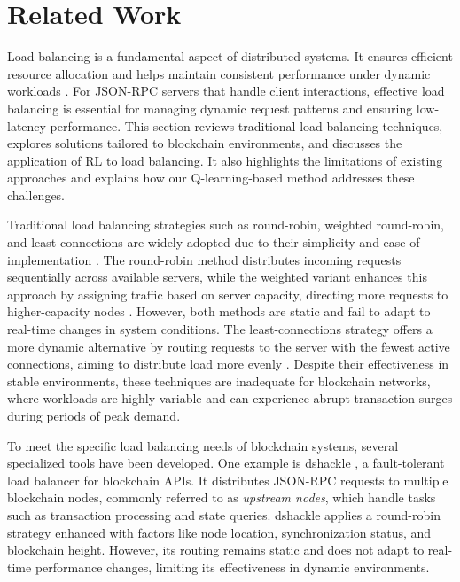 \documentclass[lnbip]{svmultln}
\begin{document}
\section{Related Work}\label{s:2}
Load balancing is a fundamental aspect of distributed systems. It ensures efficient resource allocation and helps maintain consistent performance under dynamic workloads \cite{ivanisenko2015}.  For JSON-RPC servers that handle client interactions, effective load balancing is essential for managing dynamic request patterns and ensuring low-latency performance. This section reviews traditional load balancing techniques, explores solutions tailored to blockchain environments, and discusses the application of RL to load balancing. It also highlights the limitations of existing approaches and explains how our Q-learning-based method addresses these challenges.

Traditional load balancing strategies such as round-robin, weighted round-robin, and least-connections are widely adopted due to their simplicity and ease of implementation \cite{ibrahim2021web, jader2019state}. The round-robin method distributes incoming requests sequentially across available servers, while the weighted variant enhances this approach by assigning traffic based on server capacity, directing more requests to higher-capacity nodes \cite{gilly2011up}. However, both methods are static and fail to adapt to real-time changes in system conditions. The least-connections strategy offers a more dynamic alternative by routing requests to the server with the fewest active connections, aiming to distribute load more evenly \cite{gilly2011up}. Despite their effectiveness in stable environments, these techniques are inadequate for blockchain networks, where workloads are highly variable and can experience abrupt transaction surges during periods of peak demand.

To meet the specific load balancing needs of blockchain systems, several specialized tools have been developed. One example is dshackle \cite{emeraldpay2025}, a fault-tolerant load balancer for blockchain APIs. It distributes JSON-RPC requests to multiple blockchain nodes, commonly referred to as \textit{upstream nodes}, which handle tasks such as transaction processing and state queries. dshackle applies a round-robin strategy enhanced with factors like node location, synchronization status, and blockchain height. However, its routing remains static and does not adapt to real-time performance changes, limiting its effectiveness in dynamic environments.
\end{document}
